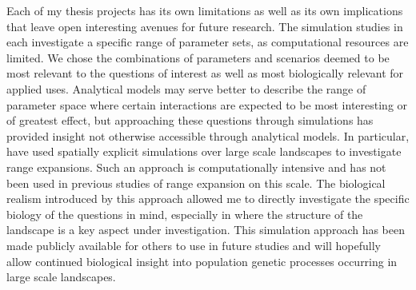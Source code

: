 Each of my thesis projects has its own limitations as well as its own implications that leave open interesting avenues for future research. The simulation studies in  each investigate a specific range of parameter sets, as computational resources are limited. We chose the combinations of parameters and scenarios deemed to be most relevant to the questions of interest as well as most biologically relevant for applied uses. Analytical models may serve better to describe the range of parameter space where certain interactions are expected to be most interesting or of greatest effect, but approaching these questions through simulations has provided insight not otherwise accessible through analytical models. In particular,  have used spatially explicit simulations over large scale landscapes to investigate range expansions. Such an approach is computationally intensive and has not been used in previous studies of range expansion on this scale. The biological realism introduced by this approach allowed me to directly investigate the specific biology of the questions in mind, especially in  where the structure of the landscape is a key aspect under investigation. This simulation approach has been made publicly available for others to use in future studies and will hopefully allow continued biological insight into population genetic processes occurring in large scale landscapes.


